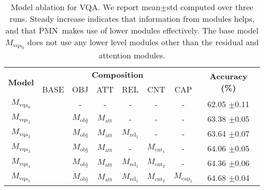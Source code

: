 \documentclass{article}
\newcommand{\cmark}{{\color{ForestGreen}\ding{51}}}
\def\PMN{PMN}
\def\Mobj{M_\mathrm{obj}}
\def\Matt{M_\mathrm{att}}
\newcommand{\rMrel}[1]{M_{\mathrm{rel}_{#1}}}
\newcommand{\rMcnt}[1]{M_{\mathrm{cnt}_{#1}}}
\newcommand{\rMcap}[1]{M_{\mathrm{cap}_{#1}}}
\newcommand{\rMvqa}[1]{M_{\mathrm{vqa}_{#1}}}
\begin{document}
\begin{table}[t!]
\vspace{-2mm}
\begin{minipage}{0.35\linewidth}
\caption{\small Model ablation for VQA.
We report mean$\pm$std computed over three runs.
Steady increase indicates that information from modules helps, and that \PMN~makes use of lower modules effectively.
The base model $\rMvqa{0}$ does not use any lower level modules other than the residual and attention modules. %
}
\label{tbl:vqa_table}
\end{minipage}
\begin{minipage}{0.65\linewidth}
\vspace{-3mm}

\begin{center}
\begin{scriptsize}
\addtolength{\tabcolsep}{-2.0pt}
\begin{tabular}{cccccccc}
\toprule
\multirow{2}{*}{\textbf{Model}} & \multicolumn{6}{c}{\textbf{Composition}} & \multirow{2}{*}{\textbf{Accuracy (\%)}} \\
 & BASE & OBJ & ATT & REL & CNT & CAP & \\
\midrule
$\rMvqa{0}$ & \cmark &    -    &    -    &      -      &      -      &     -       & 62.05 {\scriptsize $\pm$0.11} \\
$\rMvqa{1}$ & \cmark & $\Mobj$ & $\Matt$ &      -      &      -      &     -       & 63.38 {\scriptsize $\pm$0.05}  \\
$\rMvqa{2}$ & \cmark & $\Mobj$ & $\Matt$ & $\rMrel{1}$ &      -      &     -       & 63.64 {\scriptsize $\pm$0.07}  \\
$\rMvqa{3}$ & \cmark & $\Mobj$ & $\Matt$ &      -      & $\rMcnt{1}$ &     -       & 64.06 {\scriptsize $\pm$0.05}  \\
$\rMvqa{4}$ & \cmark & $\Mobj$ & $\Matt$ & $\rMrel{1}$ & $\rMcnt{2}$ &     -       & 64.36 {\scriptsize $\pm$0.06}  \\
$\rMvqa{5}$ & \cmark & $\Mobj$ & $\Matt$ & $\rMrel{1}$ & $\rMcnt{2}$ & $\rMcap{1}$ & 64.68 {\scriptsize $\pm$0.04}  \\
\bottomrule
\end{tabular}
\end{scriptsize}
\end{center}



\end{minipage}
\end{table}
\end{document}
